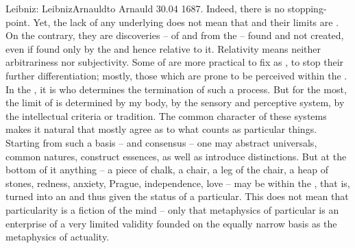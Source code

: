 \pa Leibniz: \citet{Fictions of the mind, everywhere; and if we cannot discover
  what is truly a complete being, or a substance, we will have no stopping-point
  [...]}{LeibnizArnauld}{to Arnauld 30.04 1687.}  Indeed, there is no
stopping-point.  Yet, the lack of any underlying  does not mean
that  and their limits are .  On the
contrary, they are discoveries --  of and from the
 -- found and not created, even if found only by the
 and hence relative to it.  Relativity means
neither arbitrariness nor subjectivity.  Some of  are more practical
to fix as , to stop their further differentiation; mostly, those
which are prone to be perceived within the \hoa.  In the , it is  who determines the termination of such
a process. But for the most, the limit of  is determined by
my body, by the sensory and perceptive system, by the intellectual criteria or
tradition.  The common character of these systems makes it natural that 
mostly agree as to what counts as particular things.  Starting from such a basis
-- and consensus -- one may abstract universals, common natures, construct
essences, as well as introduce distinctions. But at the bottom of it anything --
a piece of chalk, a chair, a leg of the chair, a heap of stones, redness,
anxiety, Prague, independence, love -- may be  within the \hoa, that
is, turned into an  and thus given the status of a particular. This
does not mean that particularity is a fiction of the mind -- only that
metaphysics of particular  is an enterprise of a very limited
validity founded on the equally narrow basis as the metaphysics of actuality.

